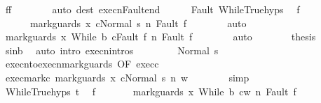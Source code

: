 \begin{isabellebody}
\ {\isachardoublequoteopen}f{\isacharprime}{\isacharequal}f{\isachardoublequoteclose}\isanewline
\ \ \ \ \ \ \isamarkupfalse%
\ {\isacharparenleft}auto\ dest{\isacharcolon}\ execn{\isacharunderscore}Fault{\isacharunderscore}end{\isacharparenright}\isanewline
\ \ \ \ \isamarkupfalse%
\ Fault\ WhileTrue{\isachardot}hyps\ \isamarkupfalse%
\ f{\isacharprime}{\isacharprime}\ \isanewline
\ \ \ \ \ \ {\isachardoublequoteopen}{\isasymGamma}{\isasymturnstile}{\isasymlangle}mark{\isacharunderscore}guards\ x\ c{\isacharcomma}Normal\ s{\isasymrangle}\ {\isacharequal}n{\isasymRightarrow}\ Fault\ f{\isacharprime}{\isacharprime}{\isachardoublequoteclose}\isanewline
\ \ \ \ \ \ \isamarkupfalse%
\ auto\isanewline
\ \ \ \ \isamarkupfalse%
\ \isamarkupfalse%
\ {\isachardoublequoteopen}{\isasymGamma}{\isasymturnstile}{\isasymlangle}mark{\isacharunderscore}guards\ x\ {\isacharparenleft}While\ b\ c{\isacharparenright}{\isacharcomma}Fault\ f{\isacharprime}{\isacharprime}{\isasymrangle}\ {\isacharequal}n{\isasymRightarrow}\ Fault\ f{\isacharprime}{\isacharprime}{\isachardoublequoteclose}\isanewline
\ \ \ \ \ \ \isamarkupfalse%
\ auto\isanewline
\ \ \ \ \isamarkupfalse%
\ \isamarkupfalse%
\ {\isacharquery}thesis\isanewline
\ \ \ \ \ \ \isamarkupfalse%
\ s{\isacharunderscore}in{\isacharunderscore}b\ \isamarkupfalse%
\ {\isacharparenleft}auto\ intro{\isacharcolon}\ execn{\isachardot}intros{\isacharparenright}\isanewline
\ \ \isamarkupfalse%
\isanewline
\ \ \ \ \isamarkupfalse%
\ {\isacharparenleft}Normal\ s{\isacharprime}{\isacharparenright}\isanewline
\ \ \ \ \isamarkupfalse%
\ execn{\isacharunderscore}to{\isacharunderscore}execn{\isacharunderscore}mark{\isacharunderscore}guards\ {\isacharbrackleft}OF\ exec{\isacharunderscore}c{\isacharbrackright}\ \isanewline
\ \ \ \ \isamarkupfalse%
\ exec{\isacharunderscore}mark{\isacharunderscore}c{\isacharcolon}\ {\isachardoublequoteopen}{\isasymGamma}{\isasymturnstile}{\isasymlangle}mark{\isacharunderscore}guards\ x\ c{\isacharcomma}Normal\ s{\isasymrangle}\ {\isacharequal}n{\isasymRightarrow}\ w{\isachardoublequoteclose}\isanewline
\ \ \ \ \ \ \isamarkupfalse%
\ simp\isanewline
\ \ \ \ \isamarkupfalse%
\ WhileTrue{\isachardot}hyps\ t\ \isamarkupfalse%
\ f{\isacharprime}\ \isanewline
\ \ \ \ \ \ {\isachardoublequoteopen}{\isasymGamma}{\isasymturnstile}{\isasymlangle}mark{\isacharunderscore}guards\ x\ {\isacharparenleft}While\ b\ c{\isacharparenright}{\isacharcomma}w{\isasymrangle}\ {\isacharequal}n{\isasymRightarrow}\ Fault\ f{\isacharprime}{\isachardoublequoteclose}\ \isanewline

\end{isabellebody}
